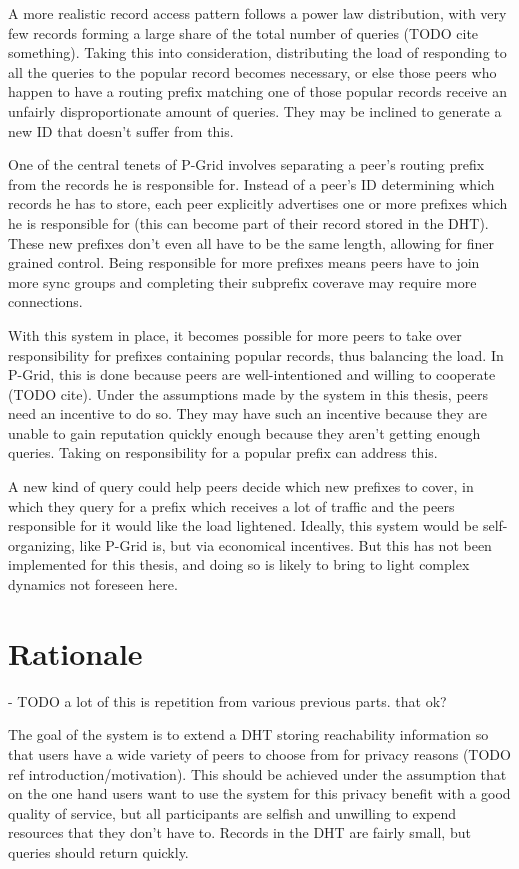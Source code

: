 A more realistic record access pattern follows a power law distribution, with
very few records forming a large share of the total number of queries (TODO cite
something). Taking this into consideration, distributing the load of responding
to all the queries to the popular record becomes necessary, or else those peers
who happen to have a routing prefix matching one of those popular records
receive an unfairly disproportionate amount of queries. They may be inclined to
generate a new ID that doesn't suffer from this.

One of the central tenets of P-Grid involves separating a peer's routing prefix
from the records he is responsible for. Instead of a peer's ID determining which
records he has to store, each peer explicitly advertises one or more prefixes
which he is responsible for (this can become part of their record stored in the
\ac{DHT}). These new prefixes don't even all have to be the same length,
allowing for finer grained control. Being responsible for more prefixes means
peers have to join more sync groups and completing their subprefix coverave may
require more connections.

With this system in place, it becomes possible for more peers to take over
responsibility for prefixes containing popular records, thus balancing the load.
In P-Grid, this is done because peers are well-intentioned and willing to
cooperate (TODO cite). Under the assumptions made by the system in this thesis,
peers need an incentive to do so. They may have such an incentive because they
are unable to gain reputation quickly enough because they aren't getting enough
queries. Taking on responsibility for a popular prefix can address this.

A new kind of query could help peers decide which new prefixes to cover, in
which they query for a prefix which receives a lot of traffic and the peers
responsible for it would like the load lightened. Ideally, this system would be
self-organizing, like P-Grid is, but via economical incentives. But this has not
been implemented for this thesis, and doing so is likely to bring to light
complex dynamics not foreseen here.

\section{Rationale}
\label{sec:desc_rationale}
- TODO a lot of this is repetition from various previous parts. that ok?

The goal of the system is to extend a \ac{DHT} storing reachability information
so that users have a wide variety of peers to choose from for privacy reasons
(TODO ref introduction/motivation). This should be achieved under the assumption
that on the one hand users want to use the system for this privacy benefit with
a good quality of service, but all participants are selfish and unwilling to
expend resources that they don't have to. Records in the \ac{DHT} are fairly
small, but queries should return quickly.

